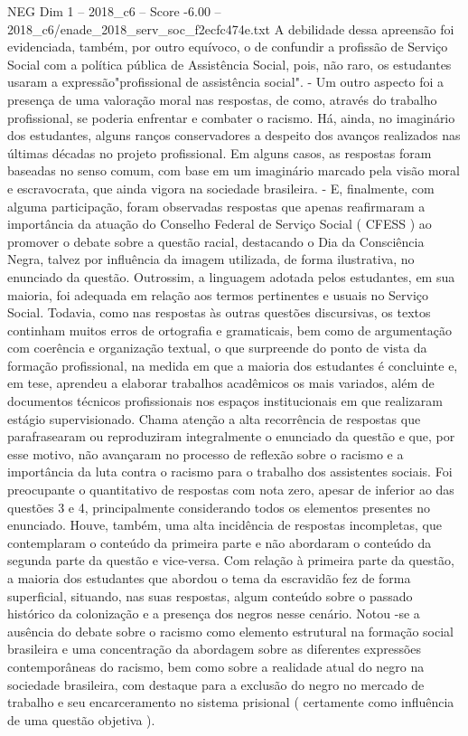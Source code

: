 \begin{textsample}{NEG Dim 1 – 2018\_c6 – Score -6.00 – 2018\_c6/enade\_2018\_serv\_soc\_f2ecfc474e.txt}
A debilidade dessa apreensão foi evidenciada, também, por outro equívoco, o de confundir a profissão de Serviço Social com a política pública de Assistência Social, pois, não raro, os estudantes usaram a expressão"profissional de assistência social". - Um outro aspecto foi a presença de uma valoração moral nas respostas, de como, através do trabalho profissional, se poderia enfrentar e combater o racismo.
Há, ainda, no imaginário dos estudantes, alguns ranços conservadores a despeito dos avanços realizados nas últimas décadas no projeto profissional.
Em alguns casos, as respostas foram baseadas no senso comum, com base em um imaginário marcado pela visão moral e escravocrata, que ainda vigora na sociedade brasileira. - E, finalmente, com alguma participação, foram observadas respostas que apenas reafirmaram a importância da atuação do Conselho Federal de Serviço Social ( CFESS ) ao promover o debate sobre a questão racial, destacando o Dia da Consciência Negra, talvez por influência da imagem utilizada, de forma ilustrativa, no enunciado da questão.
Outrossim, a linguagem adotada pelos estudantes, em sua maioria, foi adequada em relação aos termos pertinentes e usuais no Serviço Social.
Todavia, como nas respostas às outras questões discursivas, os textos continham muitos erros de ortografia e gramaticais, bem como de argumentação com coerência e organização textual, o que surpreende do ponto de vista da formação profissional, na medida em que a maioria dos estudantes é concluinte e, em tese, aprendeu a elaborar trabalhos acadêmicos os mais variados, além de documentos técnicos profissionais nos espaços institucionais em que realizaram estágio supervisionado.
Chama atenção a alta recorrência de respostas que parafrasearam ou reproduziram integralmente o enunciado da questão e que, por esse motivo, não avançaram no processo de reflexão sobre o racismo e a importância da luta contra o racismo para o trabalho dos assistentes sociais.
Foi preocupante o quantitativo de respostas com nota zero, apesar de inferior ao das questões 3 e 4, principalmente considerando todos os elementos presentes no enunciado.
Houve, também, uma alta incidência de respostas incompletas, que contemplaram o conteúdo da primeira parte e não abordaram o conteúdo da segunda parte da questão e vice-versa.
Com relação à primeira parte da questão, a maioria dos estudantes que abordou o tema da escravidão fez de forma superficial, situando, nas suas respostas, algum conteúdo sobre o passado histórico da colonização e a presença dos negros nesse cenário.
Notou -se a ausência do debate sobre o racismo como elemento estrutural na formação social brasileira e uma concentração da abordagem sobre as diferentes expressões contemporâneas do racismo, bem como sobre a realidade atual do negro na sociedade brasileira, com destaque para a exclusão do negro no mercado de trabalho e seu encarceramento no sistema prisional ( certamente como influência de uma questão objetiva ).

\end{textsample}
